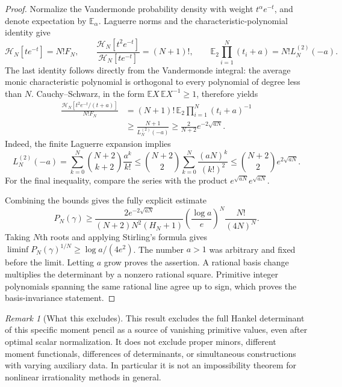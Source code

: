 \documentclass[11pt,a4paper]{article}
\theoremstyle{definition}
\theoremstyle{remark}
\newtheorem{remark}[theorem]{Remark}
\numberwithin{equation}{section}
\begin{document}
\begin{proof}
Normalize the Vandermonde probability density with weight
$t^\alpha e^{-t}$, and denote expectation by $\mathbb E_\alpha$.
Laguerre norms and the characteristic-polynomial identity give
\[
 \mathcal H_N[te^{-t}]=N!F_N,\qquad
 \frac{\mathcal H_N[t^2e^{-t}]}{\mathcal H_N[te^{-t}]}=(N+1)!,
 \qquad
 \mathbb E_2\prod_{i=1}^N(t_i+a)=N!L_N^{(2)}(-a).
\]
The last identity follows directly from the Vandermonde integral:
the average monic characteristic polynomial is orthogonal to every
polynomial of degree less than $N$.  Cauchy--Schwarz, in the form
$\mathbb E X\,\mathbb E X^{-1}\geq1$, therefore yields
\begin{align*}
 \frac{\mathcal H_N[t^2e^{-t}/(t+a)]}{N!F_N}
 &=(N+1)!\,\mathbb E_2\prod_{i=1}^N(t_i+a)^{-1}\\
 &\geq\frac{N+1}{L_N^{(2)}(-a)}
 \geq\frac{2}{N+2}e^{-2\sqrt{aN}}.
\end{align*}
Indeed, the finite Laguerre expansion implies
\[
 L_N^{(2)}(-a)
 =\sum_{k=0}^N\binom{N+2}{k+2}\frac{a^k}{k!}
 \leq\binom{N+2}{2}\sum_{k=0}^N\frac{(aN)^k}{(k!)^2}
 \leq\binom{N+2}{2}e^{2\sqrt{aN}}.
\]
For the final inequality, compare the series with the product
$e^{\sqrt{aN}}e^{\sqrt{aN}}$.

Combining the bounds gives the fully explicit estimate
\begin{equation}\label{p6:eq:det-primitive-lower}
 P_N(\gamma)\geq
 \frac{2e^{-2\sqrt{aN}}}{(N+2)N^2(H_N+1)}
 \left(\frac{\log a}{e}\right)^N\frac{N!}{(4N)^N}.
\end{equation}
Taking $N$th roots and applying Stirling's formula gives
$\liminf P_N(\gamma)^{1/N}\geq\log a/(4e^2)$.
The number $a>1$ was arbitrary and fixed before the limit.  Letting
$a$ grow proves the assertion.  A rational basis change multiplies
the determinant by a nonzero rational square.  Primitive integer
polynomials spanning the same rational line agree up to sign,
which proves the basis-invariance statement.
\end{proof}

\begin{remark}[What this excludes]
This result excludes the full Hankel determinant of this specific
moment pencil as a source of vanishing primitive values, even after
optimal scalar normalization.  It does not exclude proper minors,
different moment functionals, differences of determinants, or
simultaneous constructions with varying auxiliary data.  In
particular it is not an impossibility theorem for nonlinear
irrationality methods in general.
\end{remark}
\end{document}
